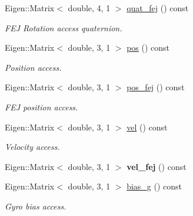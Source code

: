 \begin{DoxyCompactItemize}
\mbox{\label{classov__type_1_1IMU_a4bcd57c1285852ba4ece139b12787251}} 
Eigen\+::\+Matrix$<$ double, 4, 1 $>$ \hyperlink{classov__type_1_1IMU_a4bcd57c1285852ba4ece139b12787251}{quat\+\_\+fej} () const
\begin{DoxyCompactList}\small\item\em F\+EJ Rotation access quaternion. \end{DoxyCompactList}\item 
\mbox{\label{classov__type_1_1IMU_ada4cc66b7fb6a38944c61b08599cc55f}} 
Eigen\+::\+Matrix$<$ double, 3, 1 $>$ \hyperlink{classov__type_1_1IMU_ada4cc66b7fb6a38944c61b08599cc55f}{pos} () const
\begin{DoxyCompactList}\small\item\em Position access. \end{DoxyCompactList}\item 
\mbox{\label{classov__type_1_1IMU_ab6f68955da2f060d286fbc7db99b96e7}} 
Eigen\+::\+Matrix$<$ double, 3, 1 $>$ \hyperlink{classov__type_1_1IMU_ab6f68955da2f060d286fbc7db99b96e7}{pos\+\_\+fej} () const
\begin{DoxyCompactList}\small\item\em F\+EJ position access. \end{DoxyCompactList}\item 
\mbox{\label{classov__type_1_1IMU_ab9a75b1353679fd26e18df4b1a92b7fa}} 
Eigen\+::\+Matrix$<$ double, 3, 1 $>$ \hyperlink{classov__type_1_1IMU_ab9a75b1353679fd26e18df4b1a92b7fa}{vel} () const
\begin{DoxyCompactList}\small\item\em Velocity access. \end{DoxyCompactList}\item 
\mbox{\label{classov__type_1_1IMU_a7760d3c3298bf0e69256eb168d60592c}} 
Eigen\+::\+Matrix$<$ double, 3, 1 $>$ {\bfseries vel\+\_\+fej} () const
\item 
\mbox{\label{classov__type_1_1IMU_a934683d471f8f24bd526772d3146be0e}} 
Eigen\+::\+Matrix$<$ double, 3, 1 $>$ \hyperlink{classov__type_1_1IMU_a934683d471f8f24bd526772d3146be0e}{bias\+\_\+g} () const
\begin{DoxyCompactList}\small\item\em Gyro bias access. \end{DoxyCompactList}\item 

\end{DoxyCompactItemize}
